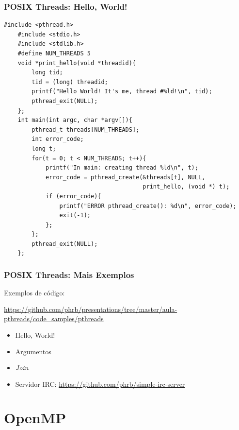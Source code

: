 \documentclass[10pt, compress, aspectratio=169, xcolor={table,usenames,dvipsnames}]{beamer}
\begin{document}
\begin{frame}[fragile]
    \frametitle{POSIX Threads: Hello, World!}
    \begin{adjustbox}{width=.65\textwidth,center}
    \begin{lstlisting}[basicstyle=\ttfamily\scriptsize]
    #include <pthread.h>
    #include <stdio.h>
    #include <stdlib.h>
    #define NUM_THREADS 5
    void *print_hello(void *threadid){
        long tid;
        tid = (long) threadid;
        printf("Hello World! It's me, thread #%ld!\n", tid);
        pthread_exit(NULL);
    };
    int main(int argc, char *argv[]){
        pthread_t threads[NUM_THREADS];
        int error_code;
        long t;
        for(t = 0; t < NUM_THREADS; t++){
            printf("In main: creating thread %ld\n", t);
            error_code = pthread_create(&threads[t], NULL,
                                        print_hello, (void *) t);
            if (error_code){
                printf("ERROR pthread_create(): %d\n", error_code);
                exit(-1);
            };
        };
        pthread_exit(NULL);
    };
    \end{lstlisting}
    \end{adjustbox}
\end{frame}

\begin{frame}
    \frametitle{POSIX Threads: Mais Exemplos}
    Exemplos de código:

    {\scriptsize\url{https://github.com/phrb/presentations/tree/master/aula-pthreads/code_samples/pthreads}}
    \begin{itemize}
        \item Hello, World!
        \item Argumentos
        \item \textit{Join}
        \item Servidor IRC: \url{https://github.com/phrb/simple-irc-server}
    \end{itemize}
\end{frame}

\section{OpenMP}
\end{document}
